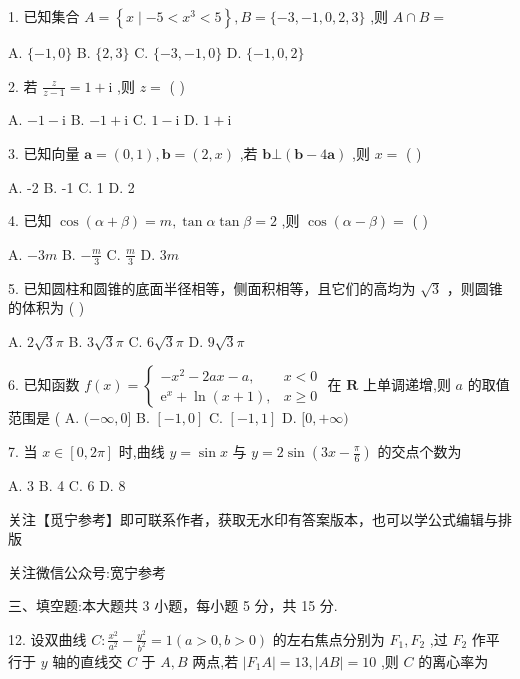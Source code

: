 \documentclass[10pt]{article}
\begin{document}
1. 已知集合 \(A = \left\{  {x \mid   - 5 < {x}^{3} < 5}\right\}  ,B = \{  - 3, - 1,0,2,3\}\) ,则 \(A \cap  B =\)

A. \(\{  - 1,0\}\) B. \(\{ 2,3\}\) C. \(\{  - 3, - 1,0\}\) D. \(\{  - 1,0,2\}\)

2. 若 \(\frac{z}{z - 1} = 1 + \mathrm{i}\) ,则 \(z =\) ( )

A. \(- 1 - \mathrm{i}\) B. \(- 1 + \mathrm{i}\) C. \(1 - \mathrm{i}\) D. \(1 + \mathrm{i}\)

3. 已知向量 \(\mathbf{a} = \left( {0,1}\right) ,\mathbf{b} = \left( {2,x}\right)\) ,若 \(\mathbf{b} \bot  \left( {\mathbf{b} - 4\mathbf{a}}\right)\) ,则 \(x =\) ( )

A. -2 B. -1 C. 1 D. 2

4. 已知 \(\cos \left( {\alpha  + \beta }\right)  = m,\tan \alpha \tan \beta  = 2\) ,则 \(\cos \left( {\alpha  - \beta }\right)  =\) ( )

A. \(- {3m}\) B. \(- \frac{m}{3}\) C. \(\frac{m}{3}\) D. \({3m}\)

5. 已知圆柱和圆锥的底面半径相等，侧面积相等，且它们的高均为 \(\sqrt{3}\) ，则圆锥的体积为 ( )

A. \(2\sqrt{3}\pi\) B. \(3\sqrt{3}\pi\) C. \(6\sqrt{3}\pi\) D. \(9\sqrt{3}\pi\)

6. 已知函数 \(f\left( x\right)  = \left\{  \begin{array}{ll}  - {x}^{2} - {2ax} - a, & x < 0 \\  {\mathrm{e}}^{x} + \ln \left( {x + 1}\right) , & x \geq  0 \end{array}\right.\) 在 \(\mathbf{R}\) 上单调递增,则 \(a\) 的取值范围是 ( A. \(( - \infty ,0\rbrack\) B. \(\left\lbrack  {-1,0}\right\rbrack\) C. \(\left\lbrack  {-1,1}\right\rbrack\) D. \(\lbrack 0, + \infty )\)

7. 当 \(x \in  \left\lbrack  {0,{2\pi }}\right\rbrack\) 时,曲线 \(y = \sin x\) 与 \(y = 2\sin \left( {{3x} - \frac{\pi }{6}}\right)\) 的交点个数为

A. 3 B. 4 C. 6 D. 8

关注【觅宁参考】即可联系作者，获取无水印有答案版本，也可以学公式编辑与排版

关注微信公众号:宽宁参考

三、填空题:本大题共 3 小题，每小题 5 分，共 15 分.

12. 设双曲线 \(C : \frac{{x}^{2}}{{a}^{2}} - \frac{{y}^{2}}{{b}^{2}} = 1\left( {a > 0,b > 0}\right)\) 的左右焦点分别为 \({F}_{1},{F}_{2}\) ,过 \({F}_{2}\) 作平行于 \(y\) 轴的直线交 \(C\) 于 \(A,B\) 两点,若 \(\left| {{F}_{1}A}\right|  = {13},\left| {AB}\right|  = {10}\) ,则 \(C\) 的离心率为
\end{document}
